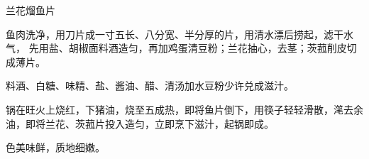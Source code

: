 %
%
%
%
%
%
%
\begin{recipe}{兰花熘鱼片}

\ingredients


\preparation

\step 鱼肉洗净，用刀片成一寸五长、八分宽、半分厚的片，用清水漂后捞起，滤干水气，
先用盐、胡椒面料酒造匀，再加鸡蛋清豆粉；兰花抽心，去茎；茨菰削皮切成薄片。

\step 料酒、白糖、味精、盐、酱油、醋、清汤加水豆粉少许兑成滋汁。

\step 锅在旺火上烧红，下猪油，烧至五成热，即将鱼片倒下，用筷子轻轻滑散，滗去余
油，即将兰花、茨菰片投入造匀，立即烹下滋汁，起锅即成。

\features

色美味鲜，质地细嫩。

\end{recipe}

